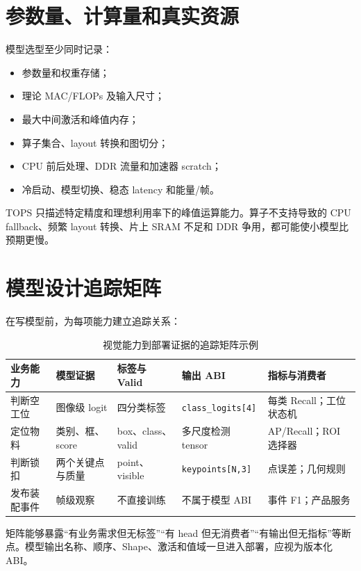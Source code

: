 \section{参数量、计算量和真实资源}

模型选型至少同时记录：

\begin{itemize}
  \item 参数量和权重存储；
  \item 理论 MAC/FLOPs 及输入尺寸；
  \item 最大中间激活和峰值内存；
  \item 算子集合、layout 转换和图切分；
  \item CPU 前后处理、DDR 流量和加速器 scratch；
  \item 冷启动、模型切换、稳态 latency 和能量/帧。
\end{itemize}

TOPS 只描述特定精度和理想利用率下的峰值运算能力。算子不支持导致的 CPU fallback、频繁 layout 转换、片上 SRAM 不足和 DDR 争用，都可能使小模型比预期更慢。

\section{模型设计追踪矩阵}

在写模型前，为每项能力建立追踪关系：

\begin{table}[H]
  \centering
  \caption{视觉能力到部署证据的追踪矩阵示例}
  \begin{tabular}{p{21mm}p{26mm}p{29mm}p{31mm}p{28mm}}
    \hline
    业务能力 & 模型证据 & 标签与 Valid & 输出 ABI & 指标与消费者 \\
    \hline
    判断空工位 & 图像级 logit & 四分类标签 & \texttt{class\_logits[4]} & 每类 Recall；工位状态机 \\
    定位物料 & 类别、框、score & box、class、valid & 多尺度检测 tensor & AP/Recall；ROI 选择器 \\
    判断锁扣 & 两个关键点与质量 & point、visible & \texttt{keypoints[N,3]} & 点误差；几何规则 \\
    发布装配事件 & 帧级观察 & 不直接训练 & 不属于模型 ABI & 事件 F1；产品服务 \\
    \hline
  \end{tabular}
\end{table}

矩阵能够暴露“有业务需求但无标签”“有 head 但无消费者”“有输出但无指标”等断点。模型输出名称、顺序、Shape、激活和值域一旦进入部署，应视为版本化 ABI。

